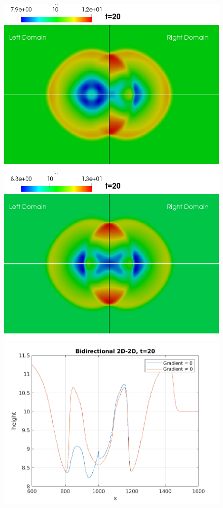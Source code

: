\begin{frame}
\begin{figure}[htp]
\centering
\includegraphics[scale=0.35]{./Resources/Images/bidirectional20_g_0.png}\hfill
\includegraphics[scale=0.35]{./Resources/Images/bidirectional20_g_bueno.png}\hfill
\includegraphics[scale=0.5]{./Resources/Images/bidirectional_graph.png}

\end{figure}
\end{frame}

